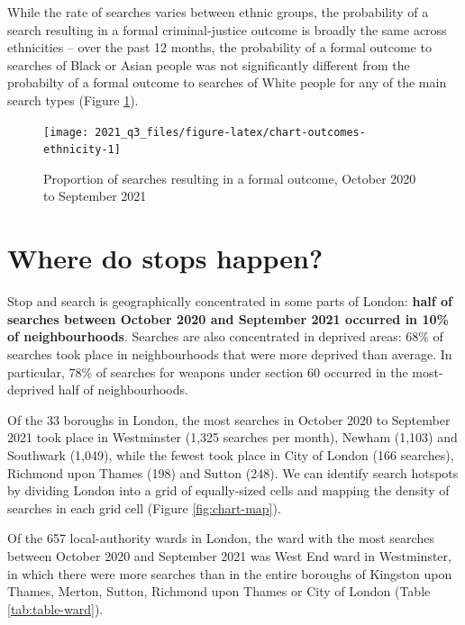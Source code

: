 \documentclass[
  a4paper,
  twoside, 11pt]{article}
\begin{document}
While the rate of searches varies between ethnic groups, the probability of a search resulting in a formal criminal-justice outcome is broadly the same across ethnicities -- over the past 12 months, the probability of a formal outcome to searches of Black or Asian people was not significantly different from the probabilty of a formal outcome to searches of White people for any of the main search types (Figure \ref{fig:chart-outcomes-ethnicity}).



\begin{figure}[tb]

{\centering \texttt{[image: 2021\_q3\_files/figure-latex/chart-outcomes-ethnicity-1]} 

}

\caption{Proportion of searches resulting in a formal outcome, October 2020 to September 2021}\label{fig:chart-outcomes-ethnicity}
\end{figure}

\hypertarget{where-do-stops-happen}{%
\section{Where do stops happen?}\label{where-do-stops-happen}}

Stop and search is geographically concentrated in some parts of London: \textbf{half of searches between October 2020 and September 2021 occurred in 10\% of neighbourhoods}. Searches are also concentrated in deprived areas: 68\% of searches took place in neighbourhoods that were more deprived than average. In particular, 78\% of searches for weapons under section 60 occurred in the most-deprived half of neighbourhoods.

Of the 33 boroughs in London, the most searches in October 2020 to September 2021 took place in Westminster (1,325 searches per month), Newham (1,103) and Southwark (1,049), while the fewest took place in City of London (166 searches), Richmond upon Thames (198) and Sutton (248). We can identify search hotspots by dividing London into a grid of equally-sized cells and mapping the density of searches in each grid cell (Figure \ref{fig:chart-map}).

Of the 657 local-authority wards in London, the ward with the most searches between October 2020 and September 2021 was West End ward in Westminster, in which there were more searches than in the entire boroughs of Kingston upon Thames, Merton, Sutton, Richmond upon Thames or City of London (Table \ref{tab:table-ward}).
\end{document}
